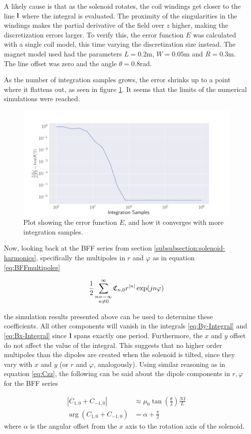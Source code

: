 A likely cause is that as the solenoid rotates, the coil windings
get closer to the line $\vb{l}$ where the integral is evaluated. The
proximity of the singularities in the windings makes the partial derivative
of the field over $z$ higher, making the discretization errors larger.
To verify this, the error function $E$ was calculated with a single coil
model, this time varying the discretization size instead. The magnet model
used had the parameters $L=0.2$m, $W=0.05$m and $R=0.3$m. The line offset
was zero and the angle $\theta=0.8$rad.

As the number
of integration samples grows, the error shrinks up to a point where it
flattens out, as seen in figure \ref{fig:ByInt-Error-convergence}. It seems
that the limits of the numerical simulations were reached.

\begin{figure}[h!]
    \centering
    \includegraphics[width=\linewidth]{figs/ByInt-Convergence.png}
    \caption{Plot showing the error function $E$, and how it converges with
        more integration samples.}
    \label{fig:ByInt-Error-convergence}
\end{figure}

Now, looking back at the BFF series from section
\ref{subsubsection:solenoid-harmonics}, specifically the
multipoles in $r$ and $\varphi$ as in equation \ref{eq:BFFmultipoles}

\begin{equation}
    \frac{1}{2} \sum\limits_{\substack{n=-\infty\\n\neq 0}}^\infty \mathfrak{C}_{n,0} r^{|n|}\exp(jn\varphi)
    \label{eq:BFFmultipoles}
\end{equation}

the simulation results presented above can be used to determine
these coefficients. All other components will vanish in the
integrals \ref{eq:By-Integral} and \ref{eq:Bx-Integral} since
$\vb{l}$ spans exactly one period. Furthermore, the
$x$ and $y$ offset do not affect the value of the integral.
This suggests that no higher order multipoles than the dipoles are
created when the solenoid is tilted, since they vary with $x$ and $y$ 
(or $r$ and $\varphi$, analogously). Using similar reasoning as
in equation \ref{eq:Czz}, the following can be said about the
dipole components in $r, \varphi$ for the BFF series

\begin{align}
    |C_{1,0} + C_{-1,0}|     & \approx \mu_0
    \tan\left( \frac{\theta}{2} \right) \frac{NI}{L}    \\
    \arg(C_{1,0} + C_{-1,0}) & = \alpha + \frac{\pi}{2}
\end{align}
where $\alpha$ is the angular offset from the $x$ axis to the rotation
axis of the solenoid.
